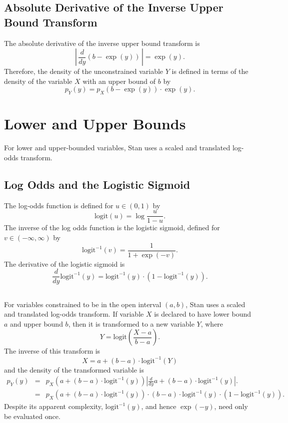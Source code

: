\documentclass[10pt]{report}
\newcommand{\Stan}{Stan\xspace}
\begin{document}
\subsection{Absolute Derivative of the Inverse Upper Bound Transform}

The absolute derivative of the inverse upper bound transform is 
\[
\left| \,
\frac{d}{dy} \left( b - \exp(y) \right)
\, \right|
= \exp(y).
\]
%
Therefore, the density of the unconstrained variable $Y$ is defined in
terms of the density of the variable $X$ with an upper bound of $b$ by
%
\[
p_Y(y) 
 =   p_X \!\left( b - \exp(y) \right) \cdot \exp(y).
\]


\section{Lower and Upper Bounds}

For lower and upper-bounded variables, \Stan uses a scaled and
translated log-odds transform.

\subsection{Log Odds and the Logistic Sigmoid}

The log-odds function is defined for $u \in (0,1)$ by
%
\[
\mbox{logit}(u) = \log \frac{u}{1 - u}.
\]
% 
The inverse of the log odds function is the logistic sigmoid, defined 
for $v \in (-\infty,\infty)$ by
%
\[
\mbox{logit}^{-1}(v) = \frac{1}{1 + \exp(-v)}.
\]
% 
The derivative of the logistic sigmoid is
%
\[
\frac{d}{dy} \mbox{logit}^{-1}(y) 
= \mbox{logit}^{-1}(y) \cdot \left( 1 - \mbox{logit}^{-1}(y) \right).
\]

\subsection{ }

For variables constrained to be in the open interval $(a,b)$, \Stan
uses a scaled and translated log-odds transform.  If variable $X$ is
declared to have lower bound $a$ and upper bound $b$, then it is
transformed to a new variable $Y$, where
%
\[
Y = \mbox{logit} \left( \frac{X - a}{b - a} \right).
\]
%
The inverse of this transform is
%
\[
X = a + (b - a) \cdot \mbox{logit}^{-1}(Y)
\]
%
and the density of the transformed variable is
%
\begin{eqnarray*}
p_Y(y) 
& = & p_X \! \left( a + (b - a) \cdot \mbox{logit}^{-1}(y) \right)
    \left|  \frac{d}{dy} a + (b - a) \cdot \mbox{logit}^{-1}(y)
    \right| .
\\[8pt]
& = & p_X \! \left( a + (b - a) \cdot \mbox{logit}^{-1}(y) \right)
    \cdot (b - a)
    \cdot \mbox{logit}^{-1}(y)
    \cdot \left( 1 - \mbox{logit}^{-1}(y) \right).
\end{eqnarray*}
%
Despite its apparent complexity, $\mbox{logit}^{-1}(y)$, and hence
$\exp(-y)$, need only be evaluated once.
\end{document}
